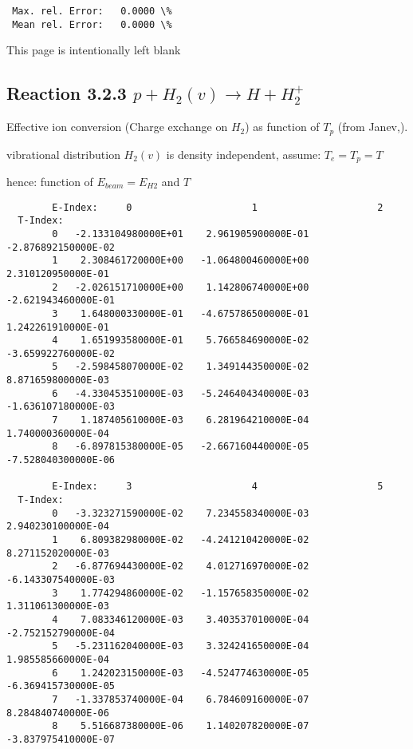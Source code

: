 \documentclass[12pt,dvipdfmx]{article}
\begin{document}
{\begin{small}
\begin{verbatim}
 Max. rel. Error:   0.0000 \%
 Mean rel. Error:   0.0000 \%

\end{verbatim}\end{small}
\newpage
This page is intentionally left blank
\newpage

\subsection{
Reaction 3.2.3  $  p + H_2(v) \rightarrow H + H_2^+  $
}
  Effective ion conversion (Charge exchange on $H_2$)
  as function of $T_p$ (from Janev,\cite{kn:Janev}).

  vibrational distribution $H_2(v)$ is density independent, assume: $T_e = T_p = T$

  hence: function of $E_{beam} = E_{H2}$ and $T$
\begin{small}\begin{verbatim}
        E-Index:     0                     1                     2
  T-Index:
        0   -2.133104980000E+01    2.961905900000E-01   -2.876892150000E-02
        1    2.308461720000E+00   -1.064800460000E+00    2.310120950000E-01
        2   -2.026151710000E+00    1.142806740000E+00   -2.621943460000E-01
        3    1.648000330000E-01   -4.675786500000E-01    1.242261910000E-01
        4    1.651993580000E-01    5.766584690000E-02   -3.659922760000E-02
        5   -2.598458070000E-02    1.349144350000E-02    8.871659800000E-03
        6   -4.330453510000E-03   -5.246404340000E-03   -1.636107180000E-03
        7    1.187405610000E-03    6.281964210000E-04    1.740000360000E-04
        8   -6.897815380000E-05   -2.667160440000E-05   -7.528040300000E-06

        E-Index:     3                     4                     5
  T-Index:
        0   -3.323271590000E-02    7.234558340000E-03    2.940230100000E-04
        1    6.809382980000E-02   -4.241210420000E-02    8.271152020000E-03
        2   -6.877694430000E-02    4.012716970000E-02   -6.143307540000E-03
        3    1.774294860000E-02   -1.157658350000E-02    1.311061300000E-03
        4    7.083346120000E-03    3.403537010000E-04   -2.752152790000E-04
        5   -5.231162040000E-03    3.324241650000E-04    1.985585660000E-04
        6    1.242023150000E-03   -4.524774630000E-05   -6.369415730000E-05
        7   -1.337853740000E-04    6.784609160000E-07    8.284840740000E-06
        8    5.516687380000E-06    1.140207820000E-07   -3.837975410000E-07


\end{verbatim}
\end{small}}
\end{document}
